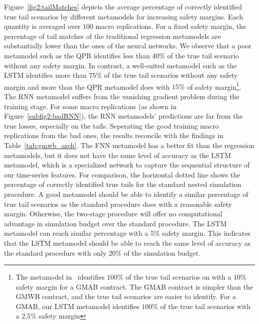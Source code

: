 Figure~\ref{fig2:tailMatches} depicts the average percentage of correctly identified true tail scenarios by different metamodels for increasing safety margins.
Each quantity is averaged over $100$ macro replications.
For a fixed safety margin, the percentage of tail matches of the traditional regression metamodels are substantially lower than the ones of the neural networks.
We observe that a poor metamodel such as the QPR identifies less than $40\%$ of the true tail scenario without any safety margin.
In contrast, a well-suited metamodel such as the LSTM identifies more than $75\%$ of the true tail scenarios without any safety margin and more than the QPR metamodel does with $15\%$ of safety margin\footnote{The metamodel in~\cite{dang2020efficient} identifies $100\%$ of the true tail scenarios on with a $10\%$ safety margin for a GMAB contract.
The GMAB contract is simpler than the GMWB contract, and the true tail scenarios are easier to identify. 
For a GMAB, our LSTM metamodel identifies $100\%$ of the true tail scenarios with a $2.5\%$ safety margin}.
The RNN metamodel suffers from the vanishing gradient problem during the training stage. 
For some macro replications (as shown in Figure~\ref{subfig2:badRNN}), the RNN metamodels' predictions are far from the true losses, especially on the tails.
Seperating the good training macro replications from the bad ones, the results reconcile with the findings in Table~\ref{tab:gmwb_arch}.
The FNN metamodel has a better fit than the regression metamodels, but it does not have the same level of accuracy as the LSTM metamodel, which is a specialized network to capture the sequential structure of our time-series features.
For comparison, the horizontal dotted line shows the percentage of correctly identified true tails for the standard nested simulation procedure.
A good metamodel should be able to identify a similar percentage of true tail scenarios as the standard procedure does with a reasonable safety margin.
Otherwise, the two-stage procedure will offer no computational advantage in simulation budget over the standard procedure.
The LSTM metamodel can reach similar percentage with a $5\%$ safety margin.
This indicates that the LSTM metamodel should be able to reach the same level of accuracy as the standard procedure with only $20\%$ of the simulation budget.

